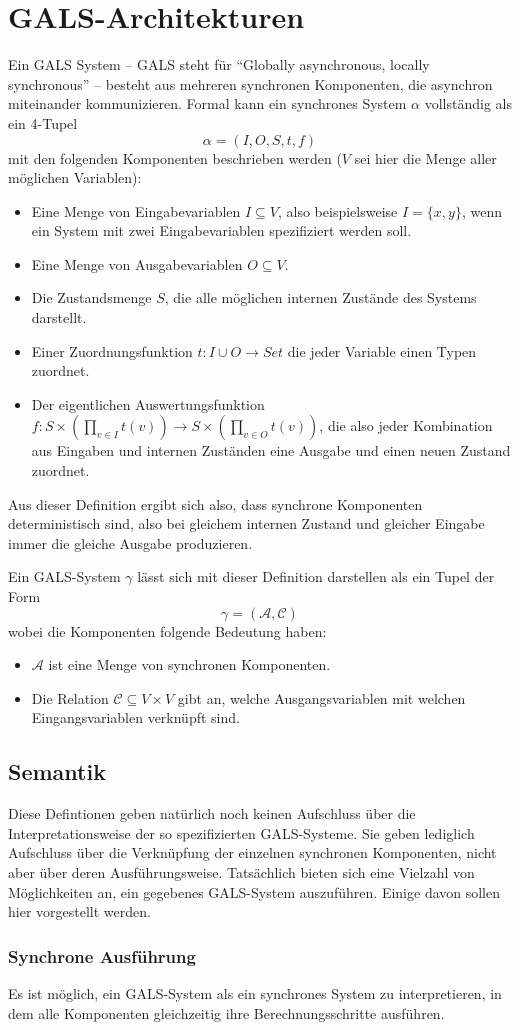 \section{GALS-Architekturen}
Ein GALS System -- GALS steht für "`Globally asynchronous, locally synchronous"' -- besteht aus mehreren synchronen Komponenten, die asynchron miteinander kommunizieren.
Formal kann ein synchrones System $\alpha$ vollständig als ein 4-Tupel
\[ \alpha = (I,O,S,t,f) \]
mit den folgenden Komponenten beschrieben werden ($V$ sei hier die Menge aller möglichen Variablen):
\begin{itemize}
\item Eine Menge von Eingabevariablen $I\subseteq V$, also beispielsweise $I=\{x,y\}$, wenn ein System mit zwei Eingabevariablen spezifiziert werden soll.
\item Eine Menge von Ausgabevariablen $O\subseteq V$.
\item Die Zustandsmenge $S$, die alle möglichen internen Zustände des Systems darstellt.
\item Einer Zuordnungsfunktion $t : I\cup O\rightarrow {Set}$ die jeder Variable einen Typen zuordnet.
\item Der eigentlichen Auswertungsfunktion $f : S\times \left(\prod_{v\in I} t(v)\right)\rightarrow S\times\left(\prod_{v\in O} t(v)\right)$, die also jeder Kombination aus Eingaben und internen Zuständen eine Ausgabe und einen neuen Zustand zuordnet.
\end{itemize}
Aus dieser Definition ergibt sich also, dass synchrone Komponenten deterministisch sind, also bei gleichem internen Zustand und gleicher Eingabe immer die gleiche Ausgabe produzieren.

Ein GALS-System $\gamma$ lässt sich mit dieser Definition darstellen als ein Tupel der Form
\[ \gamma = (\mathcal{A},\mathcal{C}) \]
wobei die Komponenten folgende Bedeutung haben:
\begin{itemize}
\item $\mathcal{A}$ ist eine Menge von synchronen Komponenten.
\item Die Relation $\mathcal{C}\subseteq V\times V$ gibt an, welche Ausgangsvariablen mit welchen Eingangsvariablen verknüpft sind.
\end{itemize}

\subsection{Semantik}
Diese Defintionen geben natürlich noch keinen Aufschluss über die Interpretationsweise der so spezifizierten GALS-Systeme.
Sie geben lediglich Aufschluss über die Verknüpfung der einzelnen synchronen Komponenten, nicht aber über deren Ausführungsweise.
Tatsächlich bieten sich eine Vielzahl von Möglichkeiten an, ein gegebenes GALS-System auszuführen.
Einige davon sollen hier vorgestellt werden.

\subsubsection{Synchrone Ausführung}
Es ist möglich, ein GALS-System als ein synchrones System zu interpretieren, in dem alle Komponenten gleichzeitig ihre Berechnungsschritte ausführen.
